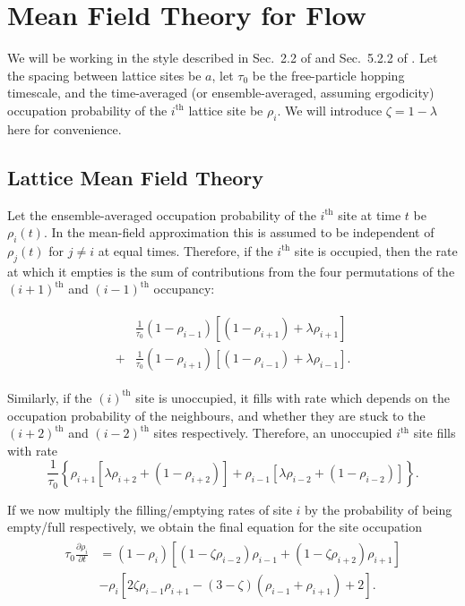 \documentclass[
reprint, amsmath,amssymb, aps,
 pre, longbibliography,
]{revtex4-1}
\newcommand{\partDeriv}[2]{\frac{\partial #1}{\partial #2}}
\begin{document}
\section{Mean Field Theory for Flow} \label{sec:mftPred}
  We will be working in the style described in Sec.~2.2 of \cite{blytheEvans2007} and Sec.~5.2.2 of \cite{AppertRolland2015}.
Let the spacing between lattice
sites be $a$, let $\tau_0$ be the free-particle hopping timescale, and
the time-averaged (or ensemble-averaged, assuming ergodicity)
occupation probability of the $i^{\mathrm{th}}$ lattice site be
$\rho_i$.  We will introduce $\zeta = 1 - \lambda $ here for convenience.

\subsection{Lattice Mean Field Theory} Let the ensemble-averaged occupation
probability of the $i^\mathrm{th}$ site at time $t$ be $\rho_i
(t)$. In the mean-field approximation this is assumed to be
independent of $\rho_j(t)$ for $j \neq i $ at equal times. Therefore,
if the $i^\mathrm{th}$ site is occupied, then the rate at which it empties
is the sum of contributions from the
four permutations of the $(i+1)^\mathrm{th}$ and
$(i-1)^\mathrm{th}$ occupancy: 

\begin{align}
\begin{split}
 &\frac{1}{\tau_0 } (1-\rho_{i-1})\left[ (1 - \rho_{i+1}) + \lambda \rho_{i+1} \right] \\
 +&\frac{1}{\tau_0 } (1-\rho_{i+1})\left[ (1 - \rho_{i-1}) + \lambda \rho_{i-1} \right] .
\end{split}
 \end{align}

Similarly, if the $(i)^\mathrm{th}$ site is unoccupied, it fills with
rate which depends on the occupation probability of the neighbours,
and whether they are stuck to the $(i+2)^\mathrm{th}$ and $(i-2)^\mathrm{th}$ sites
respectively. Therefore, an unoccupied $i^\mathrm{th}$ site fills with rate
\begin{equation}
\frac{1}{\tau_0 } \left\{ \rho_{i+1} \left[ \lambda \rho_{i+2} + (1-\rho_{i+2}) \right] + \rho_{i-1} \left[ \lambda \rho_{i-2} + (1-\rho_{i-2}) \right] \right\}.
\end{equation}

If we now multiply the filling/emptying rates of site $i$ by the
probability of being empty/full respectively, we obtain the
final equation for the site occupation 
\begin{align}
\label{eq:latticeMFT}
\begin{split}
 \tau_0 \partDeriv{\rho_i}{t} &= \left( 1-\rho_i \right) \left[ \left(1-\zeta\rho_{i-2} \right) \rho_{i-1} + \left(1-\zeta\rho_{i+2} \right) \rho_{i+1} \right] \\
 &- \rho_i \left[ 2 \zeta \rho_{i-1} \rho_{i+1}  - (3-\zeta)\left(\rho_{i-1} + \rho_{i+1}\right) + 2 \right].
 \end{split}
 \end{align}
\end{document}
